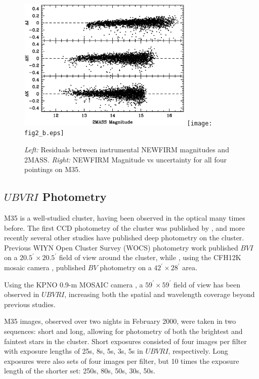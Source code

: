\documentclass[iop]{emulateapj}
\begin{document}
\begin{figure} \centering
\includegraphics[trim = 0mm 5mm 5mm 50mm, clip, width=3.3in]{fig2_a.eps}		%
\texttt{[image: fig2\_b.eps]}		%
\caption{\emph{Left:} Residuals between instrumental NEWFIRM magnitudes and 2MASS. \emph{Right:} NEWFIRM Magnitude vs uncertainty for all four pointings on M35.\label{fig:NFMphotometry}}
\end{figure}

\subsection{$UBVRI$ Photometry}
M35 is a well-studied cluster, having been observed in the optical many times before. The first CCD photometry of the cluster was published by \citet{1999MNRAS.306..361S}, and more recently several other studies \citep{2002AJ....124.1555V, 2003AJ....126.1402K, 2000AAS...196.4206S} have published deep photometry on the cluster. Previous WIYN Open Cluster Survey (WOCS) photometry work \citep{2002AJ....124.1555V} published $BVI$ on a $20.5^\prime \times 20.5^\prime$ field of view around the cluster, while \citet{2003AJ....126.1402K}, using the CFH12K mosaic camera \citep{2001ASPC..232..398C}, published $BV$ photometry on a $42^\prime \times 28^\prime$ area.

Using the KPNO 0.9-m MOSAIC camera \citep{2010SPIE.7735E.111S}, a $59^\prime \times 59^\prime$ field of view has been observed in $UBVRI$, increasing both the spatial and wavelength coverage beyond previous studies.

M35 images, observed over two nights in February 2000, were taken in two sequences: short and long, allowing for photometry of both the brightest and faintest stars in the cluster. Short exposures consisted of four images per filter with exposure lengths of 25s, 8s, 5s, 3s, 5s in $UBVRI$, respectively. Long exposures were also sets of four images per filter, but 10 times the exposure length of the shorter set: 250s, 80s, 50s, 30s, 50s.
\end{document}
